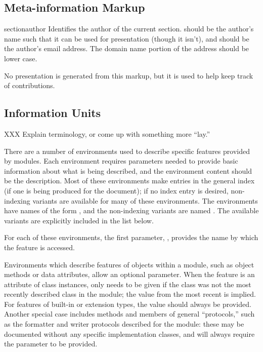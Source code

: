 \documentclass{howto}
\begin{document}
  \subsection{Meta-information Markup \label{meta-info}}

    \begin{macrodesc}{sectionauthor}{}
      Identifies the author of the current section.  
      should be the author's name such that it can be used for
      presentation (though it isn't), and  should be the
      author's email address.  The domain name portion of
      the address should be lower case.

      No presentation is generated from this markup, but it is used to
      help keep track of contributions.
    \end{macrodesc}

  \subsection{Information Units \label{info-units}}

    XXX Explain terminology, or come up with something more ``lay.''

    There are a number of environments used to describe specific
    features provided by modules.  Each environment requires
    parameters needed to provide basic information about what is being
    described, and the environment content should be the description.
    Most of these environments make entries in the general index (if
    one is being produced for the document); if no index entry is
    desired, non-indexing variants are available for many of these
    environments.  The environments have names of the form
    , and the non-indexing variants are named
    .  The available variants are explicitly
    included in the list below.

    For each of these environments, the first parameter, ,
    provides the name by which the feature is accessed.

    Environments which describe features of objects within a module,
    such as object methods or data attributes, allow an optional
     parameter.  When the feature is an attribute of
    class instances,  only needs to be given if the
    class was not the most recently described class in the module; the
     value from the most recent  is implied.
    For features of built-in or extension types, the 
    value should always be provided.  Another special case includes
    methods and members of general ``protocols,'' such as the
    formatter and writer protocols described for the
     module: these may be documented without any
    specific implementation classes, and will always require the
     parameter to be provided.
\end{document}
